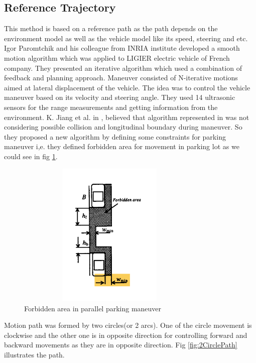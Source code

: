 \subsection{Reference Trajectory }
This method is  based on a reference path as the path depends on the environment model as well as the vehicle model like its speed, steering and etc. 
Igor Paromtchik and his colleague from INRIA institute \cite{parkingManeuver} developed a smooth motion algorithm which was applied to LIGIER electric vehicle of French company. They presented an iterative algorithm which used a combination of feedback and planning approach. Maneuver consisted of N-iterative motions aimed at lateral displacement of the vehicle. The idea was to control the vehicle maneuver based on its velocity and steering angle. They used 14 ultrasonic sensors for the range measurements and getting information from the environment. K. Jiang et al. in \cite{twoCircles}, believed that algorithm represented in \cite{parkingManeuver} was not considering possible collision and longitudinal boundary during maneuver. So they proposed a new algorithm by defining some constraints for parking maneuver i,e. they defined forbidden area for movement in parking lot as we could see in fig \ref{fig:forbiddenArea}.
\begin{figure}
    \centering
    \includegraphics[width=9cm, height=7cm]{images/forbiddenArea.pdf}
    \caption{Forbidden area in parallel parking maneuver \cite{twoCircles}}
    \label{fig:forbiddenArea}
\end{figure}
Motion path was formed by two circles(or 2 arcs). One of the circle movement is clockwise and the other one is in opposite direction for controlling forward and backward movements as they are in opposite direction. Fig \ref{fig:2CirclePath} illustrates the path.
